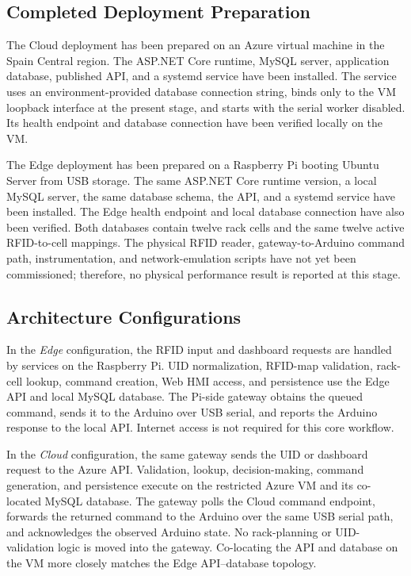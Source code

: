 \documentclass[conference]{IEEEtran}
\begin{document}
\subsection{Completed Deployment Preparation}
The Cloud deployment has been prepared on an Azure virtual machine in the Spain Central region. The ASP.NET Core runtime, MySQL server, application database, published API, and a systemd service have been installed. The service uses an environment-provided database connection string, binds only to the VM loopback interface at the present stage, and starts with the serial worker disabled. Its health endpoint and database connection have been verified locally on the VM.

The Edge deployment has been prepared on a Raspberry Pi booting Ubuntu Server from USB storage. The same ASP.NET Core runtime version, a local MySQL server, the same database schema, the API, and a systemd service have been installed. The Edge health endpoint and local database connection have also been verified. Both databases contain twelve rack cells and the same twelve active RFID-to-cell mappings. The physical RFID reader, gateway-to-Arduino command path, instrumentation, and network-emulation scripts have not yet been commissioned; therefore, no physical performance result is reported at this stage.

\subsection{Architecture Configurations}
In the \textit{Edge} configuration, the RFID input and dashboard requests are handled by services on the Raspberry Pi. UID normalization, RFID-map validation, rack-cell lookup, command creation, Web HMI access, and persistence use the Edge API and local MySQL database. The Pi-side gateway obtains the queued command, sends it to the Arduino over USB serial, and reports the Arduino response to the local API. Internet access is not required for this core workflow.

In the \textit{Cloud} configuration, the same gateway sends the UID or dashboard request to the Azure API. Validation, lookup, decision-making, command generation, and persistence execute on the restricted Azure VM and its co-located MySQL database. The gateway polls the Cloud command endpoint, forwards the returned command to the Arduino over the same USB serial path, and acknowledges the observed Arduino state. No rack-planning or UID-validation logic is moved into the gateway. Co-locating the API and database on the VM more closely matches the Edge API--database topology.
\end{document}
